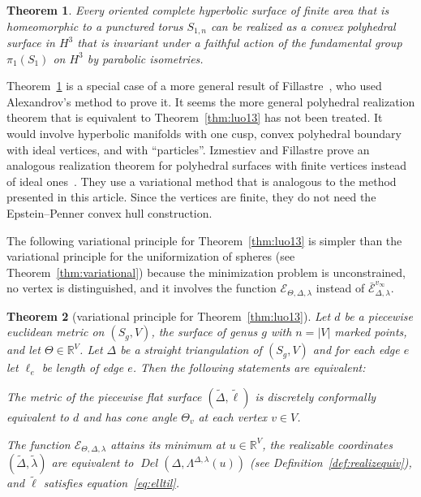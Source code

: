 \documentclass[a4paper, 11pt]{article}
\newcommand{\R}{\mathbb{R}}
\newcommand{\Deltil}{\widetilde{\Delta}}
\newcommand{\lamtil}{\tilde{\lambda}}
\newcommand{\elltil}{\tilde{\ell}}
\newcommand{\Del}{\operatorname{\textit{Del}}}
\newcommand{\Ecal}{\mathcal{E}}
\newcommand{\Ecalbar}{\bar{\Ecal}}
\theoremstyle{plain}
\newtheorem{theorem}{Theorem}[section]
\theoremstyle{definition}
\begin{document}
\begin{theorem}
  \label{thm:realizetorus}
  Every oriented complete hyperbolic surface of finite area that is
  homeomorphic to a punctured torus $S_{1,n}$ can be realized as a
  convex polyhedral surface in $H^{3}$ that is invariant under a
  faithful action of the fundamental group $\pi_{1}(S_{1})$ on $H^{3}$
  by parabolic isometries.
\end{theorem}

Theorem~\ref{thm:realizetorus} is a special case of a more general
result of Fillastre~\cite[Theorem~B]{fillastre08}, who used
Alexandrov's method to prove it. It seems the more general polyhedral
realization theorem that is equivalent to Theorem~\ref{thm:luo13} has
not been treated. It would involve hyperbolic manifolds with one cusp,
convex polyhedral boundary with ideal vertices, and with
``particles''. Izmestiev and Fillastre prove an analogous realization
theorem for polyhedral surfaces with finite vertices instead of ideal
ones~\cite{fillastre09}. They use a variational method that is
analogous to the method presented in this article. Since the vertices
are finite, they do not need the Epstein--Penner convex hull
construction.

The following variational principle for Theorem~\ref{thm:luo13} is
simpler than the variational principle for the uniformization of
spheres (see Theorem~\ref{thm:variational}) because the minimization
problem is unconstrained, no vertex is distinguished, and it involves
the function $\Ecal_{\Theta,\Delta,\lambda}$ instead of
$\Ecalbar^{v_{\infty}}_{\Delta,\lambda}$.

\begin{theorem}[variational principle for Theorem~\ref{thm:luo13}]
  \label{thm:variational2}
  Let $d$ be a piecewise euclidean metric on $(S_{g},V)$, the surface
  of genus $g$ with $n=|V|$ marked points, and let
  $\Theta\in\R^{V}$. Let $\Delta$ be a straight triangulation of
  $(S_{g},V)$ and for each edge $e$ let $\ell_{e}$ be length of edge
  $e$. Then the following statements are equivalent:
  \begin{compactenum}[(i)]
  \item The metric of the piecewise flat surface $(\Deltil,\elltil)$
    is discretely conformally equivalent to $d$ and has cone angle $\Theta_{v}$
    at each vertex $v\in V$.
  \item The function $\Ecal_{\Theta,\Delta,\lambda}$ attains its
    minimum at $u\in\R^{V}$, the realizable coordinates
    $(\Deltil,\lamtil)$ are equivalent to
    $\Del(\Delta,\Lambda^{\Delta,\lambda}(u))$ (see
    Definition~\ref{def:realizequiv}), and $\elltil$ satisfies
    equation~\eqref{eq:elltil}.
  \end{compactenum}
\end{theorem}
\end{document}
